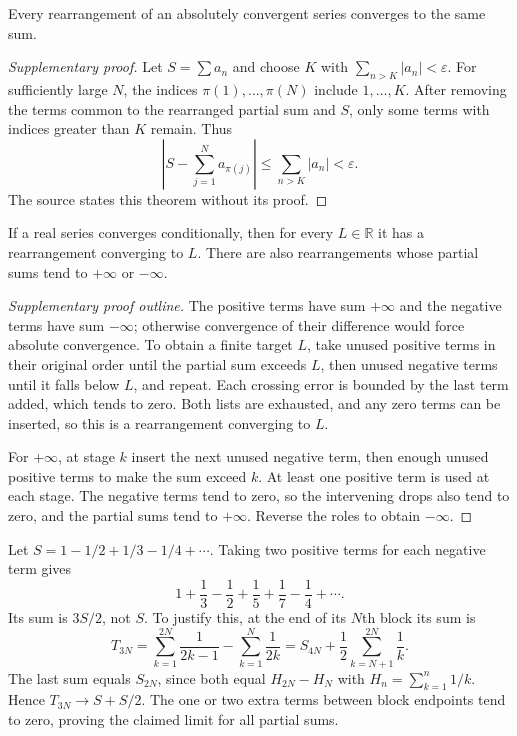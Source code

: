 \begin{theorem}
Every rearrangement of an absolutely convergent series converges to the
same sum.
\end{theorem}
\begin{proof}[Supplementary proof]
Let $S=\sum a_n$ and choose $K$ with $\sum_{n>K}|a_n|<\varepsilon$.
For sufficiently large $N$, the indices $\pi(1),\ldots,\pi(N)$ include
$1,\ldots,K$. After removing the terms common to the rearranged partial
sum and $S$, only some terms with indices greater than $K$ remain. Thus
\[
\left|S-\sum_{j=1}^N a_{\pi(j)}\right|
\leq\sum_{n>K}|a_n|<\varepsilon.
\]
The source states this theorem without its proof.
\end{proof}

\begin{theorem}
If a real series converges conditionally, then for every $L\in\mathbb R$
it has a rearrangement converging to $L$. There are also rearrangements
whose partial sums tend to $+\infty$ or $-\infty$.
\end{theorem}
\begin{proof}[Supplementary proof outline]
The positive terms have sum $+\infty$ and the negative terms have sum
$-\infty$; otherwise convergence of their difference would force absolute
convergence. To obtain a finite target $L$, take unused positive terms
in their original order until the partial sum exceeds $L$, then unused
negative terms until it falls below $L$, and repeat. Each crossing error
is bounded by the last term added, which tends to zero. Both lists are
exhausted, and any zero terms can be inserted, so this is a rearrangement
converging to $L$.

For $+\infty$, at stage $k$ insert the next unused negative term, then
enough unused positive terms to make the sum exceed $k$. At least one
positive term is used at each stage. The negative terms tend to zero,
so the intervening drops also tend to zero, and the partial sums tend to
$+\infty$. Reverse the roles to obtain $-\infty$.
\end{proof}

\begin{example}
Let $S=1-1/2+1/3-1/4+\cdots$. Taking two positive terms for each negative
term gives
\[
1+\frac13-\frac12+\frac15+\frac17-\frac14+\cdots.
\]
Its sum is $3S/2$, not $S$. To justify this, at the end of its $N$th block
its sum is
\[
T_{3N}=\sum_{k=1}^{2N}\frac1{2k-1}-\sum_{k=1}^N\frac1{2k}
=S_{4N}+\frac12\sum_{k=N+1}^{2N}\frac1k.
\]
The last sum equals $S_{2N}$, since both equal $H_{2N}-H_N$ with
$H_n=\sum_{k=1}^n1/k$. Hence $T_{3N}\to S+S/2$.
The one or two extra terms between block endpoints tend to zero, proving
the claimed limit for all partial sums.
\end{example}


